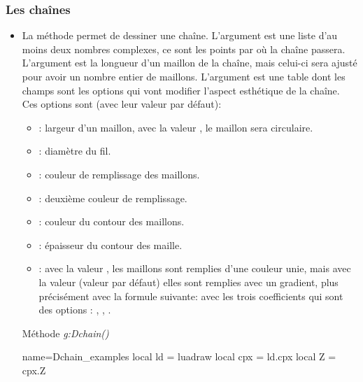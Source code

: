 \subsubsection{Les chaînes}
 
\begin{itemize}
    \item La méthode  permet de dessiner une chaîne. L'argument  est une liste d'au moins deux nombres complexes, ce sont les points par où la chaîne passera. L'argument  est la longueur d'un maillon de la chaîne, mais celui-ci sera ajusté pour avoir un nombre entier de maillons. 
    L'argument  est une table dont les champs sont les options qui vont modifier l'aspect esthétique de la chaîne. Ces options sont (avec leur valeur par défaut):
        \begin{itemize}
            \item {} : largeur d'un maillon, avec la valeur , le maillon sera circulaire.
            \item {} : diamètre du fil.
            \item {} : couleur de remplissage des maillons.
            \item {} : deuxième couleur de remplissage.
            \item {} : couleur du contour des maillons.
            \item {} : épaisseur du contour des maille.
            \item {} : avec la valeur \true, les maillons sont remplies d'une couleur unie, mais avec la valeur \false (valeur par défaut) elles sont remplies avec un gradient, plus précisément avec la formule suivante:
            avec les trois coefficients qui sont des options :  , , .
        \end{itemize}
        
\begin{demo}{Méthode \emph{g:Dchain()}}
\begin{luadraw}{name=Dchain_examples}
local ld = luadraw
local cpx = ld.cpx
local Z = cpx.Z


\end{luadraw}
\end{demo}
\end{itemize}
